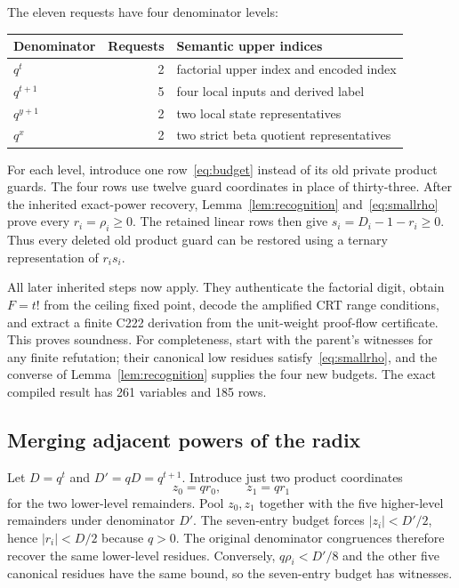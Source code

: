 \documentclass[11pt]{article}
\begin{document}
The eleven requests have four denominator levels:
\begin{center}
\begin{tabular}{lrl}
\toprule
Denominator & Requests & Semantic upper indices\\
\midrule
$q^t$ & 2 & factorial upper index and encoded index\\
$q^{t+1}$ & 5 & four local inputs and derived label\\
$q^{y+1}$ & 2 & two local state representatives\\
$q^x$ & 2 & two strict beta quotient representatives\\
\bottomrule
\end{tabular}
\end{center}
For each level, introduce one row~\eqref{eq:budget} instead of its old
private product guards. The four rows use twelve guard coordinates in
place of thirty-three. After the inherited exact-power recovery,
Lemma~\ref{lem:recognition} and~\eqref{eq:smallrho} prove every
$r_i=\rho_i\ge0$. The retained linear rows then give
$s_i=D_i-1-r_i\ge0$. Thus every deleted old product guard can be restored
using a ternary representation of $r_is_i$.

All later inherited steps now apply. They authenticate the factorial
digit, obtain $F=t!$ from the ceiling fixed point, decode the amplified
CRT range conditions, and extract a finite C222 derivation from the
unit-weight proof-flow certificate. This proves soundness. For
completeness, start with the parent's witnesses for any finite refutation;
their canonical low residues satisfy~\eqref{eq:smallrho}, and the
converse of Lemma~\ref{lem:recognition} supplies the four new budgets.
The exact compiled result has 261 variables and 185 rows.

\subsection{Merging adjacent powers of the radix}

Let $D=q^t$ and $D'=qD=q^{t+1}$. Introduce just two product coordinates
\[
 z_0=qr_0,\qquad z_1=qr_1
\]
for the two lower-level remainders. Pool $z_0,z_1$ together with the five
higher-level remainders under denominator $D'$. The seven-entry budget
forces $|z_i|<D'/2$, hence $|r_i|<D/2$ because $q>0$. The original
denominator congruences therefore recover the same lower-level residues.
Conversely, $q\rho_i<D'/8$ and the other five canonical residues have the
same bound, so the seven-entry budget has witnesses.
\end{document}
